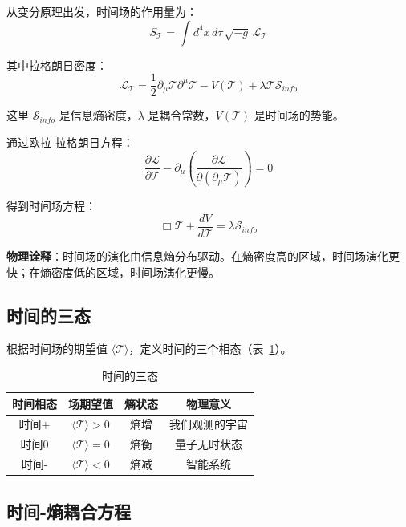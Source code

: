 \documentclass[12pt,a4paper]{article}
\begin{document}
从变分原理出发，时间场的作用量为：
\begin{equation}
S_{\mathcal{T}} = \int d^4x \, d\tau \, \sqrt{-g} \, \mathcal{L}_{\mathcal{T}}
\end{equation}

其中拉格朗日密度：
\begin{equation}
\mathcal{L}_{\mathcal{T}} = \frac{1}{2} \partial_\mu \mathcal{T} \partial^\mu \mathcal{T} - V(\mathcal{T}) + \lambda \mathcal{T} \mathcal{S}_{info}
\end{equation}

这里 $\mathcal{S}_{info}$ 是信息熵密度，$\lambda$ 是耦合常数，$V(\mathcal{T})$ 是时间场的势能。

通过欧拉-拉格朗日方程：
\begin{equation}
\frac{\partial \mathcal{L}}{\partial \mathcal{T}} - \partial_\mu \left(\frac{\partial \mathcal{L}}{\partial(\partial_\mu \mathcal{T})}\right) = 0
\end{equation}

得到时间场方程：
\begin{equation}
\Box \mathcal{T} + \frac{dV}{d\mathcal{T}} = \lambda \mathcal{S}_{info}
\label{eq:time_field}
\end{equation}

\textbf{物理诠释}：时间场的演化由信息熵分布驱动。在熵密度高的区域，时间场演化更快；在熵密度低的区域，时间场演化更慢。

\subsection{时间的三态}

根据时间场的期望值 $\langle \mathcal{T} \rangle$，定义时间的三个相态（表~\ref{tab:time_states}）。

\begin{table}[htbp]
\centering
\caption{时间的三态}
\label{tab:time_states}
\begin{tabular}{cccc}
\toprule
时间相态 & 场期望值 & 熵状态 & 物理意义 \\
\midrule
时间+ & $\langle \mathcal{T} \rangle > 0$ & 熵增 & 我们观测的宇宙 \\
时间0 & $\langle \mathcal{T} \rangle = 0$ & 熵衡 & 量子无时状态 \\
时间- & $\langle \mathcal{T} \rangle < 0$ & 熵减 & 智能系统 \\
\bottomrule
\end{tabular}
\end{table}

\subsection{时间-熵耦合方程}
\end{document}
